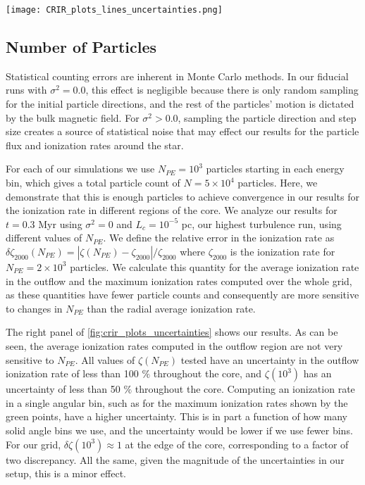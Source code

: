 \documentclass[twocolumn]{aastex63}
\begin{document}
\begin{figure*}
\centering
\texttt{[image: CRIR\_plots\_lines\_uncertainties.png]}
\caption{Left: Ionization rate for three different values of $r_{\rm bound}$, using $L_c=10^{-5}$ pc at $t=0.3$ Myr. Right: Relative error in the outflow and maximum ionization rates, where the reference value is $N_{PE}=2\times 10^{3}$ particles. The model adopts the simulation at $t=0.3$ Myr, using $L_c=10^{-5}$ pc, and $\sigma^2=1.0$.}
\label{fig:crir_plots_uncertainties}
\end{figure*}

\subsection{Number of Particles}
\label{appendix_subsection:nparticles}

Statistical counting errors are inherent in Monte Carlo methods. In our fiducial runs with $\sigma^2=0.0$, this effect is negligible because there is only random sampling for the initial particle directions, and the rest of the particles' motion is dictated by the bulk magnetic field. For $\sigma^2>0.0$, sampling the particle direction and step size creates a source of statistical noise that may effect our results for the particle flux and ionization rates around the star.

For each of our simulations we use $N_{PE}=10^{3}$ particles starting in each energy bin, which gives a total particle count of $N=5\times 10^{4}$ particles. Here, we demonstrate that this is enough particles to achieve convergence in our results for the ionization rate in different regions of the core. We analyze our results for $t=0.3$ Myr using $\sigma^2=0$ and $L_c=10^{-5}$ pc, our highest turbulence run, using different values of $N_{PE}$. We define the relative error in the ionization rate as $\delta\zeta_{2000} (N_{PE})=|\zeta(N_{PE})-\zeta_{2000}|/\zeta_{2000}$ where $\zeta_{2000}$ is the ionization rate for $N_{PE}=2\times 10^{3}$ particles. We calculate this quantity for the average ionization rate in the outflow and the maximum ionization rates computed over the whole grid, as these quantities have fewer particle counts and consequently are more sensitive to changes in $N_{PE}$ than the radial average ionization rate.

The right panel of \ref{fig:crir_plots_uncertainties} shows 
our results. As can be seen, the average ionization rates computed in the outflow region are not very sensitive to $N_{PE}$. All values of $\zeta(N_{PE})$ tested have an uncertainty in the outflow ionization rate of less than 100 $\%$ throughout the core, and $\zeta(10^{3})$ has an uncertainty of less than 50 $\%$ throughout the core. Computing an ionization rate in a single angular bin, such as for the maximum ionization rates shown by the green points, have a higher uncertainty. This is in part a function of how many solid angle bins we use, and the uncertainty would be lower if we use fewer bins. For our grid, $\delta\zeta(10^{3}) \approx 1$ at the edge of the core, corresponding to a factor of two discrepancy. All the same, given the magnitude of the uncertainties in our setup, this is a minor effect.  
\end{document}
